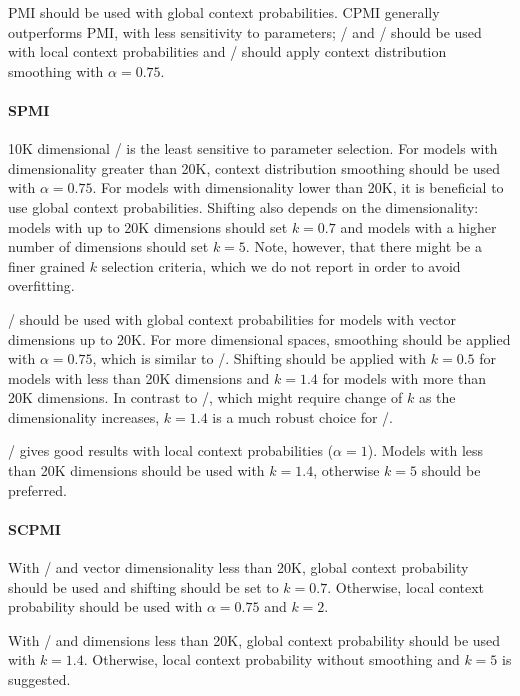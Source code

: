 \documentclass[11pt]{article}
\begin{document}
PMI should be used with global context probabilities. CPMI generally outperforms PMI, with less sensitivity to parameters; \NCPMI/ and \logNCPMI/ should be used with local context probabilities and \CPMI/ should apply context distribution smoothing with $\alpha = 0.75$.

\paragraph{SPMI}

10K dimensional \SPMI/ is the least sensitive to parameter selection. For models with dimensionality greater than 20K, context distribution smoothing should be used with $\alpha = 0.75$. For models with dimensionality lower than 20K, it is beneficial to use global context probabilities. Shifting also depends on the dimensionality: models with up to 20K dimensions should set $k = 0.7$ and models with a higher number of dimensions should set $k = 5$. Note, however, that there might be a finer grained $k$ selection criteria, which we do not report in order to avoid overfitting.



\logNSPMI/ should be used with global context probabilities for models with vector dimensions up to 20K. For more dimensional spaces, smoothing should be applied with $\alpha = 0.75$, which is similar to \SPMI/. Shifting should be applied with $k = 0.5$ for models with less than 20K dimensions and $k = 1.4$ for models with more than 20K dimensions. In contrast to \SPMI/, which might require change of $k$ as the dimensionality increases, $k = 1.4$ is a much robust choice for \logNSPMI/.

\NSPMI/ gives good results with local context probabilities ($\alpha = 1$). Models with less than 20K dimensions should be used with $k = 1.4$, otherwise $k = 5$ should be preferred.

\paragraph{SCPMI}

With \SCPMI/ and vector dimensionality less than 20K, global context probability should be used and shifting should be set to $k = 0.7$. Otherwise, local context probability should be used with $\alpha = 0.75$ and $k = 2$.

With \NSCPMI/ and dimensions less than 20K, global context probability should be used with $k = 1.4$. Otherwise, local context probability without smoothing and $k = 5$ is suggested.
\end{document}
